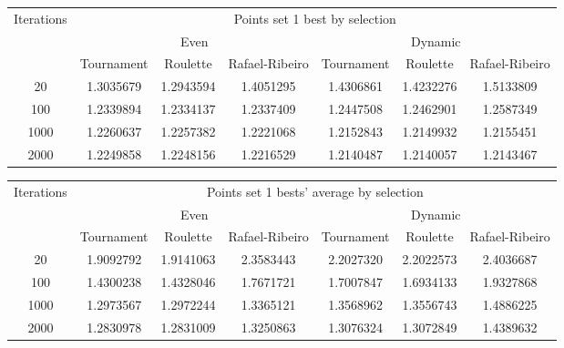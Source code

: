 \begin{center}
	\begin{tabular}{|c|c|c|c|c|c|c|}
		\hline
		\multirow{3}{*}{Iterations}	&	\multicolumn{6}{c|}{Points set 1 best by selection}	\\
										\cline{2-7}
									&	\multicolumn{3}{c|}{Even}	& \multicolumn{3}{c|}{Dynamic} \\
										\cline{2-7}
									&	Tournament		&	Roulette		&	Rafael-Ribeiro	&	Tournament		&	Roulette		&	Rafael-Ribeiro		\\
		\hline
		20							&	1.3035679		& 	1.2943594 \cellcolor[gray]{0.9}		&	1.4051295		&	1.4306861		&	1.4232276 \cellcolor[gray]{0.9}		&	1.5133809			\\
		\hline
		100							&	1.2339894		&	1.2334137 \cellcolor[gray]{0.9}		&	1.2337409		&	1.2447508 \cellcolor[gray]{0.9}		&	1.2462901		&	1.2587349			\\
		\hline
		1000						&	1.2260637		&	1.2257382		&	1.2221068 \cellcolor[gray]{0.9}		&	1.2152843		&	1.2149932 \cellcolor[gray]{0.9}		&	1.2155451			\\
		\hline
		2000						&	1.2249858		&	1.2248156		&	1.2216529 \cellcolor[gray]{0.9}		&	1.2140487		&	1.2140057 \cellcolor[gray]{0.9}		&	1.2143467			\\
		\hline
	\end{tabular}
	\label{tab:selection_type_1_best}
\end{center}

\begin{center}
	\begin{tabular}{|c|c|c|c|c|c|c|}
		\hline
		\multirow{3}{*}{Iterations}	&	\multicolumn{6}{c|}{Points set 1 bests' average by selection}	\\
										\cline{2-7}
									&	\multicolumn{3}{c|}{Even}	& \multicolumn{3}{c|}{Dynamic} \\
										\cline{2-7}
									&	Tournament		&	Roulette		&	Rafael-Ribeiro	&	Tournament		&	Roulette		&	Rafael-Ribeiro		\\
		\hline
		20							&	1.9092792 \cellcolor[gray]{0.9}		&	1.9141063		&	2.3583443		&	2.2027320		&	2.2022573 \cellcolor[gray]{0.9}		&	2.4036687			\\
		\hline
		100							&	1.4300238 \cellcolor[gray]{0.9}		&	1.4328046		&	1.7671721		&	1.7007847		&	1.6934133 \cellcolor[gray]{0.9}		&	1.9327868			\\
		\hline
		1000						&	1.2973567		&	1.2972244 \cellcolor[gray]{0.9}		&	1.3365121		&	1.3568962		&	1.3556743 \cellcolor[gray]{0.9}		&	1.4886225			\\
		\hline
		2000						&	1.2830978 \cellcolor[gray]{0.9}		&	1.2831009		&	1.3250863		&	1.3076324		&	1.3072849 \cellcolor[gray]{0.9}		&	1.4389632			\\
		\hline
	\end{tabular}
	\label{tab:selection_type_1_avg}
\end{center}

